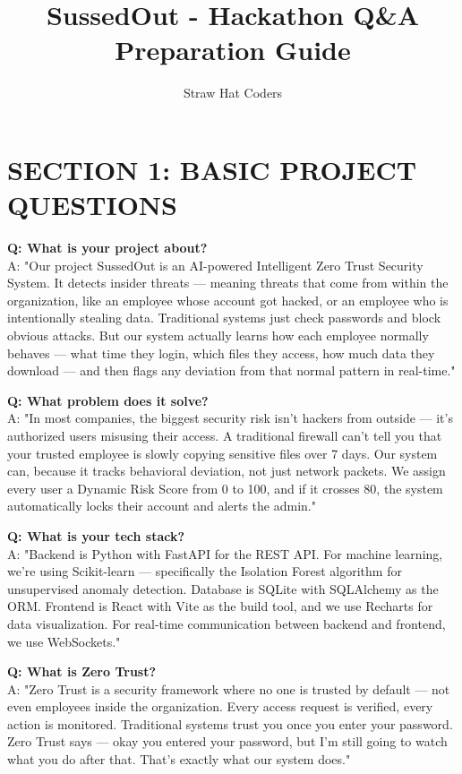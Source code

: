 \documentclass[12pt,a4paper]{article}
\title{\textbf{SussedOut - Hackathon Q\&A Preparation Guide}}
\author{Straw Hat Coders}
\date{}
\begin{document}
\maketitle

\section*{SECTION 1: BASIC PROJECT QUESTIONS}

\textbf{Q: What is your project about?} \\
A: "Our project SussedOut is an AI-powered Intelligent Zero Trust Security System. It detects insider threats — meaning threats that come from within the organization, like an employee whose account got hacked, or an employee who is intentionally stealing data. Traditional systems just check passwords and block obvious attacks. But our system actually learns how each employee normally behaves — what time they login, which files they access, how much data they download — and then flags any deviation from that normal pattern in real-time."
\vspace{10pt}

\textbf{Q: What problem does it solve?} \\
A: "In most companies, the biggest security risk isn't hackers from outside — it's authorized users misusing their access. A traditional firewall can't tell you that your trusted employee is slowly copying sensitive files over 7 days. Our system can, because it tracks behavioral deviation, not just network packets. We assign every user a Dynamic Risk Score from 0 to 100, and if it crosses 80, the system automatically locks their account and alerts the admin."
\vspace{10pt}

\textbf{Q: What is your tech stack?} \\
A: "Backend is Python with FastAPI for the REST API. For machine learning, we're using Scikit-learn — specifically the Isolation Forest algorithm for unsupervised anomaly detection. Database is SQLite with SQLAlchemy as the ORM. Frontend is React with Vite as the build tool, and we use Recharts for data visualization. For real-time communication between backend and frontend, we use WebSockets."
\vspace{10pt}

\textbf{Q: What is Zero Trust?} \\
A: "Zero Trust is a security framework where no one is trusted by default — not even employees inside the organization. Every access request is verified, every action is monitored. Traditional systems trust you once you enter your password. Zero Trust says — okay you entered your password, but I'm still going to watch what you do after that. That's exactly what our system does."
\vspace{10pt}
\end{document}
